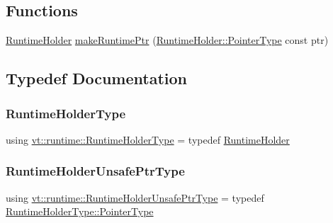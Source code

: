 \subsection*{Functions}
\begin{DoxyCompactItemize}
\item 
\hyperlink{structvt_1_1runtime_1_1_runtime_holder}{Runtime\+Holder} \hyperlink{namespacevt_1_1runtime_a71998fecf2a4d70b11e3ae4aa47810db}{make\+Runtime\+Ptr} (\hyperlink{structvt_1_1runtime_1_1_runtime_holder_a9740e8aa7487fcf38b67a7e160d7b046}{Runtime\+Holder\+::\+Pointer\+Type} const ptr)
\end{DoxyCompactItemize}


\subsection{Typedef Documentation}
\mbox{\label{namespacevt_1_1runtime_ab09d044cce417fbcdb7e1e29b7aabbc3}} 
\subsubsection{\texorpdfstring{Runtime\+Holder\+Type}{RuntimeHolderType}}
{\footnotesize\ttfamily using \hyperlink{namespacevt_1_1runtime_ab09d044cce417fbcdb7e1e29b7aabbc3}{vt\+::runtime\+::\+Runtime\+Holder\+Type} = typedef \hyperlink{structvt_1_1runtime_1_1_runtime_holder}{Runtime\+Holder}}

\mbox{\label{namespacevt_1_1runtime_a69931905b04961a874e4a70a43083a83}} 
\subsubsection{\texorpdfstring{Runtime\+Holder\+Unsafe\+Ptr\+Type}{RuntimeHolderUnsafePtrType}}
{\footnotesize\ttfamily using \hyperlink{namespacevt_1_1runtime_a69931905b04961a874e4a70a43083a83}{vt\+::runtime\+::\+Runtime\+Holder\+Unsafe\+Ptr\+Type} = typedef \hyperlink{structvt_1_1runtime_1_1_runtime_holder_a9740e8aa7487fcf38b67a7e160d7b046}{Runtime\+Holder\+Type\+::\+Pointer\+Type}}

